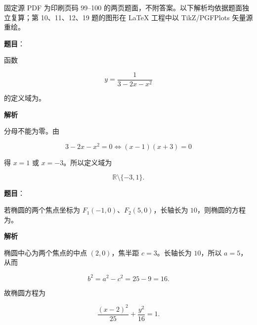 

\begin{gktip}
固定源 PDF 为印刷页码 99–100 的两页题面，不附答案。以下解析均依据题面独立复算；第 10、11、12、19 题的图形在 LaTeX 工程中以 TikZ/PGFPlots 矢量源重绘。
\end{gktip}


\begin{answer}

\textbf{题目}：

函数

\nopagebreak[4]
\[
y=\frac1{3-2x-x^2}
\]

的定义域为\gkblank{}。

\textbf{解析}

分母不能为零。由

\nopagebreak[4]
\[
3-2x-x^2=0
\Longleftrightarrow
(x-1)(x+3)=0
\]

得 $x=1$ 或 $x=-3$。所以定义域为

\nopagebreak[4]
\[
\mathbb R\setminus\{-3,1\}.
\]


\end{answer}
\begin{answer}

\textbf{题目}：

若椭圆的两个焦点坐标为 $F_1(-1,0)$、$F_2(5,0)$，长轴长为 $10$，则椭圆的方程为\gkblank{}。

\textbf{解析}

椭圆中心为两个焦点的中点 $(2,0)$，焦半距 $c=3$。长轴长为 $10$，所以 $a=5$，从而

\nopagebreak[4]
\[
b^2=a^2-c^2=25-9=16.
\]

故椭圆方程为

\nopagebreak[4]
\[
\frac{(x-2)^2}{25}+\frac{y^2}{16}=1.
\]


\end{answer}
